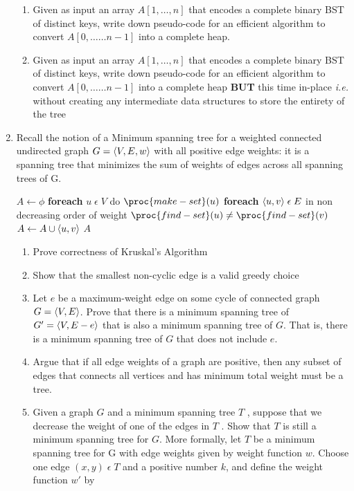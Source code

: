 \documentclass[10pt]{article}
\DeclarePairedDelimiter\angled{\langle}{\rangle}
\begin{document}
\begin{flushleft}
\begin{enumerate}[topsep=-10pt, itemsep=10pt]
\begin{enumerate}
        \item Given as input an array $A[1,\dots,n]$ that encodes a complete binary BST of distinct keys, write down pseudo-code for an efficient algorithm to convert $A[0,\dots \dots n-1]$ into a complete heap.
        \item Given as input an array $A[1,\dots,n]$ that encodes a complete binary BST of distinct keys, write down pseudo-code for an efficient algorithm to convert $A[0,\dots \dots n-1]$ into a complete heap \textbf{BUT} this time in-place \textit{i.e.} without creating any intermediate data structures to store the entirety of the tree
    \end{enumerate}
    \newpage
    \item Recall the notion of a Minimum spanning tree for a weighted connected undirected graph $G = \angled{V, E, w}$ with all positive edge weights: it is a spanning tree that minimizes the sum of weights of edges across all spanning trees of G.
    \begin{codebox}
    \li $A \leftarrow \phi$ 
    \li \textbf{foreach} $u\; \epsilon\; V$ do $\proc{make-set}(u)$
    \li \textbf{foreach} $\angled{u,v}\; \epsilon\; E$ in non decreasing order of weight
        \Do
    \li \If $\proc{find-set}(u) \neq \proc{find-set}(v)$
    \li \Then $A \leftarrow A \cup {\angled{u,v}}$
    \li {}
    \End
    \End
    \li \Return $A$
    \end{codebox}
    \vspace{0 mm}
    \begin{enumerate}
        \item Prove correctness of Kruskal's Algorithm 
        \item Show that the smallest non-cyclic edge is a valid greedy choice
        \item Let $e$ be a maximum-weight edge on some cycle of connected graph $G =  \angled{V, E}$. Prove that there is a minimum spanning tree of $G' =  \angled{V, E-{e}}$ that is also a minimum spanning tree of $G$. That is, there is a minimum spanning tree of $G$ that does not include $e$.
        \item Argue that if all edge weights of a graph are positive, then any subset of edges that connects all vertices and has minimum total weight must be a tree.
        \item Given a graph $G$ and a minimum spanning tree $T$ , suppose that we decrease the weight of one of the edges in $T$ . Show that $T$ is still a minimum spanning tree for $G$. More formally, let $T$ be a minimum spanning tree for G with edge weights given by weight function $w$. Choose one edge $(x,y)\; \epsilon\; T$ and a positive number $k$, and define the weight function $w'$ by

\end{enumerate}
\end{enumerate}
\end{flushleft}
\end{document}
